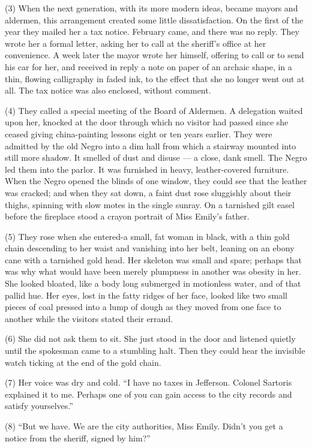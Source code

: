 \documentclass[UTF8,11pt]{ctexart}
\begin{document}
(3) When the next generation, with its more modern ideas, became mayors and aldermen, this arrangement created some little dissatisfaction. On the first of the year they mailed her a tax notice. February came, and there was no reply. They wrote her a formal letter, asking her to call at the sheriff’s office at her convenience. A week later the mayor wrote her himself, offering to call or to send his car for her, and received in reply a note on paper of an archaic shape, in a thin, flowing calligraphy in faded ink, to the effect that she no longer went out at all. The tax notice was also enclosed, without comment.


(4) They called a special meeting of the Board of Aldermen. A delegation waited upon her, knocked at the door through which no visitor had passed since she ceased giving china-painting lessons eight or ten years earlier. They were admitted by the old Negro into a dim hall from which a stairway mounted into still more shadow. It smelled of dust and disuse — a close, dank smell. The Negro led them into the parlor. It was furnished in heavy, leather-covered furniture. When the Negro opened the blinds of one window, they could see that the leather was cracked; and when they sat down, a faint dust rose sluggishly about their thighs, spinning with slow motes in the single sunray. On a tarnished gilt easel before the fireplace stood a crayon portrait of Miss Emily’s father.


(5) They rose when she entered-a small, fat woman in black, with a thin gold chain descending to her waist and vanishing into her belt, leaning on an ebony cane with a tarnished gold head. Her skeleton was small and spare; perhaps that was why what would have been merely plumpness in another was obesity in her. She looked bloated, like a body long submerged in motionless water, and of that pallid hue. Her eyes, lost in the fatty ridges of her face, looked like two small pieces of coal pressed into a lump of dough as they moved from one face to another while the visitors stated their errand.


(6) She did not ask them to sit. She just stood in the door and listened quietly until the spokesman came to a stumbling halt. Then they could hear the invisible watch ticking at the end of the gold chain.


(7) Her voice was dry and cold. “I have no taxes in Jefferson. Colonel Sartoris explained it to me. Perhaps one of you can gain access to the city records and satisfy yourselves.”


(8) “But we have. We are the city authorities, Miss Emily. Didn’t you get a notice from the sheriff, signed by him?”
\end{document}
